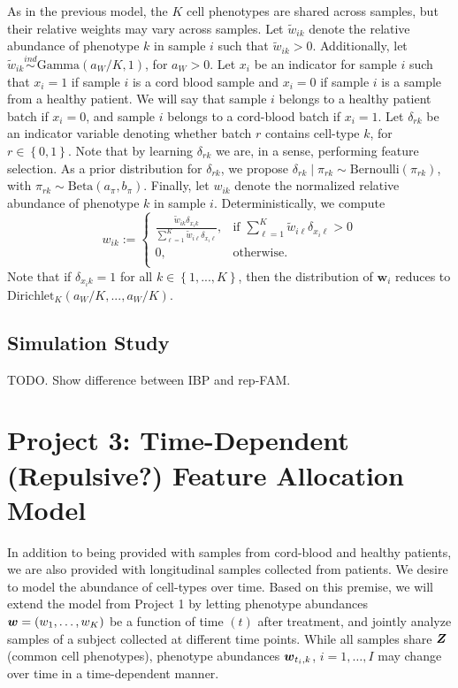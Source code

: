 \documentclass[12pt,]{article}
\newcommand{\bc}[1]{ \left\{#1\right\} }
\newcommand{\ds}{ \displaystyle }
\newcommand{\ind}{\overset{ind}{\sim}}
\def\Bern{\text{Bernoulli}}
\def\Dir{\text{Dirichlet}}
\newcommand{\bZ}{\mbox{\boldmath $Z$}}
\newcommand{\bw}{\mbox{\boldmath $w$}}
\begin{document}
As in the previous model, the $K$ cell phenotypes are shared across samples,
but their relative weights may vary across samples. Let $\tilde w_{ik}$ denote
the relative abundance of phenotype $k$ in sample $i$ such that $\tilde w_{ik}
> 0$.  Additionally, let $\tilde w_{ik} \ind \text{Gamma}(a_W/K, 1)$, for
$a_W>0$.  Let $x_i$ be an indicator for sample $i$ such that $x_i=1$ if sample
$i$ is a cord blood sample and $x_i=0$ if sample $i$ is a sample from a healthy
patient. We will say that sample $i$ belongs to a healthy patient batch if
$x_i=0$, and sample $i$ belongs to a cord-blood batch if $x_i=1$.
Let $\delta_{rk}$ be an indicator variable denoting whether batch $r$ contains
cell-type $k$, for $r\in\bc{0,1}$. Note that by learning $\delta_{rk}$ we
are, in a sense, performing feature selection. As a prior distribution for
$\delta_{rk}$, we propose $\delta_{rk} \mid \pi_{rk} \sim
\Bern(\pi_{rk})$, with $\pi_{rk} \sim \text{Beta}(a_\pi, b_\pi)$. Finally, let
$w_{ik}$ denote the normalized relative abundance of phenotype $k$ in 
sample $i$. Deterministically, we compute 
$$ w_{ik} :=
\begin{cases}
  \ds\frac{\tilde w_{ik} \delta_{x_i k}}{\sum_{\ell=1}^K\tilde w_{i\ell} \delta_{x_i \ell}}, &
  \text{if } \sum_{\ell=1}^K\tilde w_{i\ell} \delta_{x_i \ell} > 0 \\
  0, & \text{otherwise}. \\
\end{cases}
$$
Note that if $\delta_{x_i k} = 1$ for all $k\in\bc{1,...,K}$, then the
distribution of $\bm w_i$ reduces to $\Dir_K(a_W/K,...,a_W/K)$.

\subsection{Simulation Study}
TODO. Show difference between IBP and rep-FAM.


\section{Project 3: Time-Dependent (Repulsive?) Feature Allocation Model}\label{sec:proj3}
In addition to being provided with samples from cord-blood and healthy
patients, we are also provided with longitudinal samples collected from
patients.  We desire to model the abundance of cell-types over time. Based on
this premise, we will extend the model from Project 1 by letting phenotype
abundances $\bw=(w_1, \ldots, w_K)$ be a function of time $(t)$ after
treatment, and jointly analyze samples of a subject collected at different time
points.  While all samples share $\bZ$ (common cell phenotypes), phenotype
abundances $\bw_{t_i, k}$, $i=1, \ldots, I$ may change over time in a
time-dependent manner.
\end{document}
